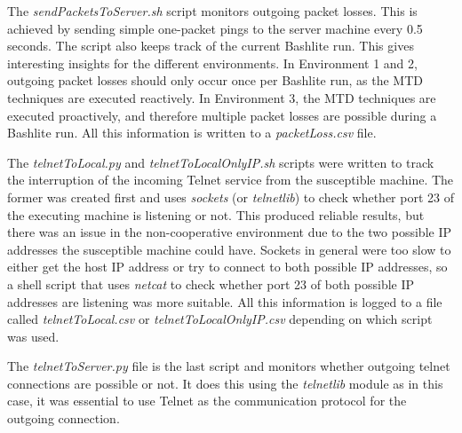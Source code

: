 
The \textit{sendPacketsToServer.sh} script monitors outgoing packet losses. This is achieved by sending simple one-packet pings to the server machine every 0.5 seconds. The script also keeps track of the current Bashlite run. This gives interesting insights for the different environments. In Environment 1 and 2, outgoing packet losses should only occur once per Bashlite run, as the MTD techniques are executed reactively. In Environment 3, the MTD techniques are executed proactively, and therefore multiple packet losses are possible during a Bashlite run. All this information is written to a \textit{packetLoss.csv} file.

The \textit{telnetToLocal.py} and \textit{telnetToLocalOnlyIP.sh} scripts were written to track the interruption of the incoming Telnet service from the susceptible machine. The former was created first and uses \textit{sockets} (or \textit{telnetlib}) to check whether port 23 of the executing machine is listening or not. This produced reliable results, but there was an issue in the non-cooperative environment due to the two possible IP addresses the susceptible machine could have. Sockets in general were too slow to either get the host IP address or try to connect to both possible IP addresses, so a shell script that uses \textit{netcat} to check whether port 23 of both possible IP addresses are listening was more suitable. All this information is logged to a file called \textit{telnetToLocal.csv} or \textit{telnetToLocalOnlyIP.csv} depending on which script was used.

The \textit{telnetToServer.py} file is the last script and monitors whether outgoing telnet connections are possible or not. It does this using the \textit{telnetlib} module as in this case, it was essential to use Telnet as the communication protocol for the outgoing connection. 




